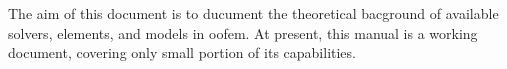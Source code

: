 The aim of this document is to ducument the theoretical bacground of available solvers, elements, and models in oofem. At present, this manual is a working document, covering only small portion of its capabilities.  
